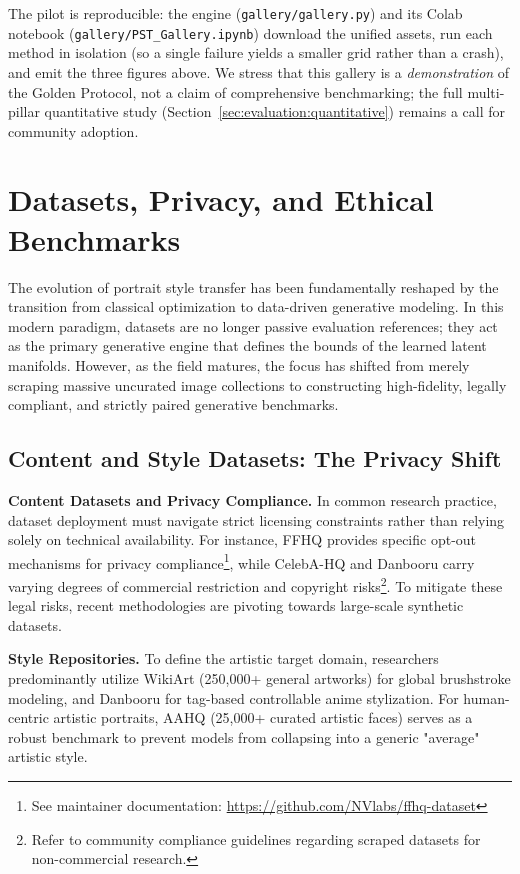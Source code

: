 \documentclass[journal]{IEEEtran}
\begin{document}
The pilot is reproducible: the engine (\texttt{gallery/gallery.py}) and its Colab notebook (\texttt{gallery/PST\_Gallery.ipynb}) download the unified assets, run each method in isolation (so a single failure yields a smaller grid rather than a crash), and emit the three figures above. We stress that this gallery is a \textit{demonstration} of the Golden Protocol, not a claim of comprehensive benchmarking; the full multi-pillar quantitative study (Section~\ref{sec:evaluation:quantitative}) remains a call for community adoption.

\section{Datasets, Privacy, and Ethical Benchmarks}
\label{sec:datasets}

The evolution of portrait style transfer has been fundamentally reshaped by the transition from classical optimization to data-driven generative modeling. In this modern paradigm, datasets are no longer passive evaluation references; they act as the primary generative engine that defines the bounds of the learned latent manifolds. However, as the field matures, the focus has shifted from merely scraping massive uncurated image collections to constructing high-fidelity, legally compliant, and strictly paired generative benchmarks.

\subsection{Content and Style Datasets: The Privacy Shift}
\label{sec:datasets:content_style}

\textbf{Content Datasets and Privacy Compliance.} In common research practice, dataset deployment must navigate strict licensing constraints rather than relying solely on technical availability. For instance, FFHQ provides specific opt-out mechanisms for privacy compliance\footnote{See maintainer documentation: \url{https://github.com/NVlabs/ffhq-dataset}}, while CelebA-HQ and Danbooru carry varying degrees of commercial restriction and copyright risks\footnote{Refer to community compliance guidelines regarding scraped datasets for non-commercial research.}. To mitigate these legal risks, recent methodologies are pivoting towards large-scale synthetic datasets.

\textbf{Style Repositories.} To define the artistic target domain, researchers predominantly utilize WikiArt \cite{wikiart} (250,000+ general artworks) for global brushstroke modeling, and Danbooru \cite{danbooru2021} for tag-based controllable anime stylization. For human-centric artistic portraits, AAHQ \cite{liu2021blendgan} (25,000+ curated artistic faces) serves as a robust benchmark to prevent models from collapsing into a generic "average" artistic style.
\end{document}
